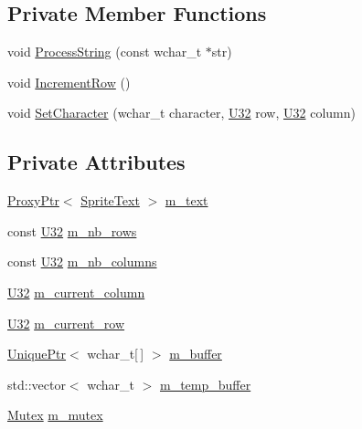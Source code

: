 \subsection*{Private Member Functions}
\begin{DoxyCompactItemize}
\item 
void \hyperlink{classmage_1_1script_1_1_text_console_script_a29334fd8aa8de09b2f28c24096347498}{Process\+String} (const wchar\+\_\+t $\ast$str)
\item 
void \hyperlink{classmage_1_1script_1_1_text_console_script_a3d4cba4fd8a2733933a7a444c6beaf1a}{Increment\+Row} ()
\item 
void \hyperlink{classmage_1_1script_1_1_text_console_script_a18bdee79ee6f53e28f90b607c36c8188}{Set\+Character} (wchar\+\_\+t character, \hyperlink{namespacemage_a41c104c036fba3756a74e19f793eeaa1}{U32} row, \hyperlink{namespacemage_a41c104c036fba3756a74e19f793eeaa1}{U32} column)
\end{DoxyCompactItemize}
\subsection*{Private Attributes}
\begin{DoxyCompactItemize}
\item 
\hyperlink{classmage_1_1_proxy_ptr}{Proxy\+Ptr}$<$ \hyperlink{classmage_1_1_sprite_text}{Sprite\+Text} $>$ \hyperlink{classmage_1_1script_1_1_text_console_script_a227a1a94f00552c267b7d3f3516676d6}{m\+\_\+text}
\item 
const \hyperlink{namespacemage_a41c104c036fba3756a74e19f793eeaa1}{U32} \hyperlink{classmage_1_1script_1_1_text_console_script_a9d00451cf1cf319512e0c88352d22911}{m\+\_\+nb\+\_\+rows}
\item 
const \hyperlink{namespacemage_a41c104c036fba3756a74e19f793eeaa1}{U32} \hyperlink{classmage_1_1script_1_1_text_console_script_a480c394aece0f517b9d10c4e912aadc9}{m\+\_\+nb\+\_\+columns}
\item 
\hyperlink{namespacemage_a41c104c036fba3756a74e19f793eeaa1}{U32} \hyperlink{classmage_1_1script_1_1_text_console_script_a10d396ae897b441a7cfc1f77c50eb16e}{m\+\_\+current\+\_\+column}
\item 
\hyperlink{namespacemage_a41c104c036fba3756a74e19f793eeaa1}{U32} \hyperlink{classmage_1_1script_1_1_text_console_script_abd3f8ee3c17545968fcf403ec9aef83d}{m\+\_\+current\+\_\+row}
\item 
\hyperlink{namespacemage_a3316d7143a973e37adf1110f2e80ca31}{Unique\+Ptr}$<$ wchar\+\_\+t\mbox{[}$\,$\mbox{]} $>$ \hyperlink{classmage_1_1script_1_1_text_console_script_a35db160ce89d4ebf6f184d2fe850beab}{m\+\_\+buffer}
\item 
std\+::vector$<$ wchar\+\_\+t $>$ \hyperlink{classmage_1_1script_1_1_text_console_script_ae62bf3d6f88f297eb37892d507d8a032}{m\+\_\+temp\+\_\+buffer}
\item 
\hyperlink{classmage_1_1_mutex}{Mutex} \hyperlink{classmage_1_1script_1_1_text_console_script_af9962aa57cbbe3b8bbc2217d2f28112b}{m\+\_\+mutex}
\end{DoxyCompactItemize}
